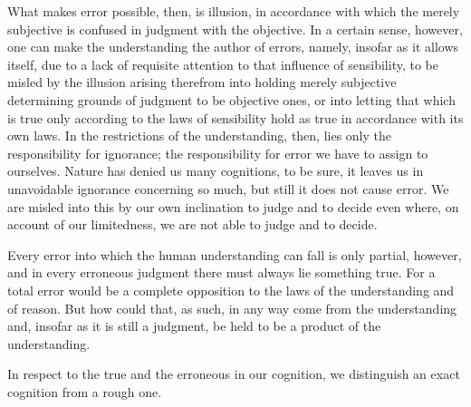 What makes error possible, then, is illusion,
in accordance with which the merely subjective is
confused in judgment with the objective.
In a certain sense, however, one can make the understanding the author
of errors, namely, insofar as it allows itself,
due to a lack of requisite attention to that influence of sensibility,
to be misled by the illusion arising therefrom into holding
merely subjective determining grounds of judgment to be objective ones,
or into letting that which is true only according to
the laws of sensibility hold as true in accordance with its own laws.
In the restrictions of the understanding, then,
lies only the responsibility for ignorance;
the responsibility for error we have to assign to ourselves.
Nature has denied us many cognitions, to be sure,
it leaves us in unavoidable ignorance concerning so much,
but still it does not cause error.
We are misled into this by our own inclination to judge and
to decide even where, on account of our limitedness,
we are not able to judge and to decide.

Every error into which the human understanding can fall is only partial,
however, and in every erroneous judgment there must always lie something true.
For a total error would be a complete opposition to
the laws of the understanding and of reason.
But how could that, as such, in any way come from the understanding and,
insofar as it is still a judgment, be held to be a product of the understanding.

In respect to the true and the erroneous in our cognition,
we distinguish an exact cognition from a rough one.

